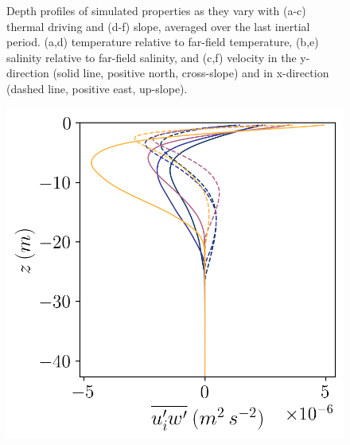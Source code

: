 \documentclass[draft]{styles/agujournal2019}
\begin{document}
\begin{figure}[h!]
\begin{minipage}{0.33\textwidth}
    \end{minipage}
    \caption{Depth profiles of simulated properties as they vary with (a-c) thermal driving and (d-f) slope, averaged over the last inertial period. (a,d) temperature relative to far-field temperature, (b,e) salinity relative to far-field salinity, and (c,f) velocity in the y-direction (solid line, positive north, cross-slope) and in x-direction (dashed line, positive east, up-slope). }
    \label{fig:dT_profiles}
\end{figure}

\begin{figure}[h!]
    \centering
    \begin{minipage}{0.33\textwidth}
        \includegraphics[trim={0 0 0 0},clip,width=\textwidth]{Figures/momflux_cmp_dT_43h_tav13h_z_profile.png}
    \end{minipage}%
    \begin{minipage}{0.33\textwidth}

\end{minipage}
\end{figure}
\end{document}
